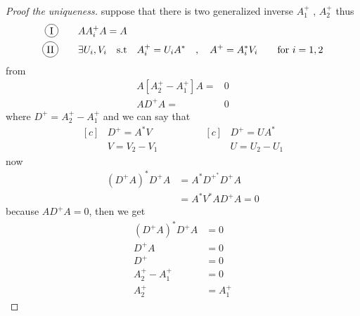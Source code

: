 \documentclass[]{article}
\begin{document}
\begin{proof}[Proof the uniqueness]
        suppose that there is two generalized inverse $A_1^{+}$ , $A_2^{+}$ thus
        \begin{align*}
                \circled{I}& \dquad AA_i^{+}A = A
                \\
                \circled{II}& \dquad \exists  U_i,V_i \quad \text{s.t} \quad A_i^{+} = U_i A^{*} \quad,\quad A^{+} = A_i^{*}V_i \dquad \text{for }i=1,2
        \end{align*}
from  
\begin{align*}
        A[A_2^{+}-A_1^{+}]A =& 0
        \\
        AD^{+}A=&0
\end{align*}
where $D^{+} = A_2^{+}-A_1^{+}$ and we can say that 
\begin{equation*}
        \begin{aligned}[c]
            &D^{+} = A^{*}V
            \\
            &V = V_2-V_1
        \end{aligned}
        \qquad\qquad
        \begin{aligned}[c]
        &D^{+} = UA^{*}
        \\
        &U = U_2-U_1
        \end{aligned}
    \end{equation*}
now
\begin{align*}
        (D^{+}A)^{*}D^{+}A &= A^* D^{+^{\textstyle *}} D^{+} A
        \\
        &= A^* V^{*}A D^{+} A = 0
\end{align*}
because $AD^{+}A=0$, then we get 
\begin{align*}
        (D^{+}A)^{*}D^{+}A &= 0
        \\
        D^{+}A &= 0
        \\
        D^{+} &= 0
        \\
        A_2^{+}-A_1^{+} &= 0
        \\
        A_2^{+} &=A_1^{+}
\end{align*}
\end{proof}
\end{document}
